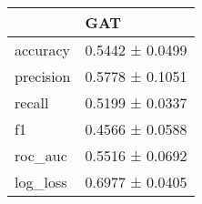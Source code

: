 \begin{tabular}{ll}
\toprule
 & GAT \\
\midrule
accuracy & 0.5442 ± 0.0499 \\
precision & 0.5778 ± 0.1051 \\
recall & 0.5199 ± 0.0337 \\
f1 & 0.4566 ± 0.0588 \\
roc_auc & 0.5516 ± 0.0692 \\
log_loss & 0.6977 ± 0.0405 \\
\bottomrule
\end{tabular}
